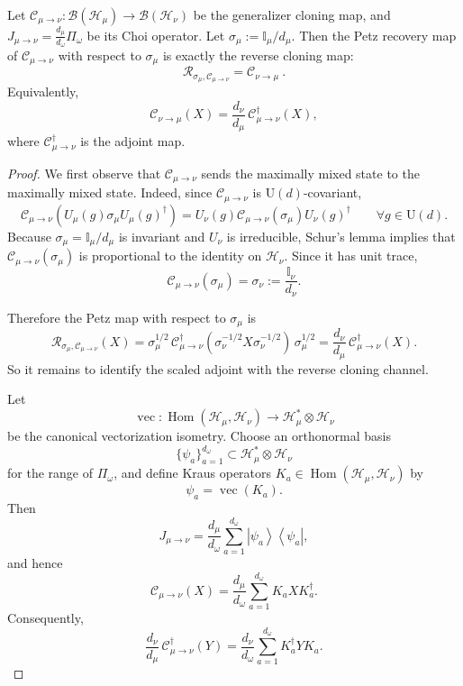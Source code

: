 \documentclass[a4paper,onecolumn,11pt]{quantumarticle}
\providecommand{\customgenericname}{}
\newenvironment{mprop}[1]{%
  \renewcommand\customgenericname{Proposition}%
  \renewcommand\theinnercustomgeneric{#1}%
  \innercustomgeneric
}{\endinnercustomgeneric}
\newcommand{\ketbra}[2]{\left|#1\right\rangle\!\!\left\langle #2\right|}
\def\id{\mathbb{I}}
\def\C{\mathcal{C}}
\begin{document}
\begin{mprop}{2}[Reverse Cloner]
Let $\C_{\mu\to\nu}:\mathcal B(\mathcal H_\mu)\to \mathcal B(\mathcal H_\nu)$
be the generalizer cloning map, and $J_{\mu\to\nu}=\frac{d_\mu}{d_\omega}\Pi_\omega$ be its Choi operator. Let $\sigma_\mu :=  \id_\mu/d_\mu$.
Then the Petz recovery map of \(\C_{\mu\to\nu}\) with respect to \(\sigma_\mu\) is exactly the reverse  cloning map:
\[
\mathcal R_{\sigma_\mu,\C_{\mu\to\nu}}=\C_{\nu\to\mu}\ .
\]
Equivalently,
\[
\C_{\nu\to\mu}(X)=\frac{d_\nu}{d_\mu}\,\C_{\mu\to\nu}^{\dagger}(X),
\]
where \(\C_{\mu\to\nu}^{\dagger}\) is the adjoint map.
\end{mprop}

\begin{proof}
We first observe that \(\C_{\mu\to\nu}\) sends the maximally mixed state to the maximally mixed state. Indeed, since \(\C_{\mu\to\nu}\) is \(\mathrm U(d)\)-covariant,
\[
\C_{\mu\to\nu}\!\left(U_\mu(g)\sigma_\mu U_\mu(g)^\dagger\right)
=
U_\nu(g)\C_{\mu\to\nu}(\sigma_\mu)U_\nu(g)^\dagger
\qquad \forall g\in \mathrm U(d).
\]
Because \(\sigma_\mu=\id_\mu/d_\mu\) is invariant and \(U_\nu\) is irreducible, Schur's lemma implies that \(\C_{\mu\to\nu}(\sigma_\mu)\) is proportional to the identity on \(\mathcal H_\nu\). Since it has unit trace,
\[
\C_{\mu\to\nu}(\sigma_\mu)=\sigma_\nu:= \frac{\id_\nu}{d_\nu}.
\]

Therefore the Petz map with respect to \(\sigma_\mu\) is
\[
\mathcal R_{\sigma_\mu,\C_{\mu\to\nu}}(X)
=
\sigma_\mu^{1/2}\,
\C_{\mu\to\nu}^{\dagger}
\!\left(
\sigma_\nu^{-1/2}X\sigma_\nu^{-1/2}
\right)
\,\sigma_\mu^{1/2}
=
\frac{d_\nu}{d_\mu}\,\C_{\mu\to\nu}^{\dagger}(X).
\]
So it remains to identify the scaled adjoint with the reverse cloning channel.

Let
\[
\operatorname{vec}:\operatorname{Hom}(\mathcal H_\mu,\mathcal H_\nu)\longrightarrow \mathcal H_\mu^*\otimes \mathcal H_\nu
\]
be the canonical vectorization isometry. Choose an orthonormal basis
\[
\{\psi_a\}_{a=1}^{d_\omega}
\subset \mathcal H_\mu^*\otimes \mathcal H_\nu
\]
for the range of \(\Pi_\omega\), and define Kraus operators \(K_a\in \operatorname{Hom}(\mathcal H_\mu,\mathcal H_\nu)\) by
\[
\psi_a=\operatorname{vec}(K_a).
\]
Then
\[
J_{\mu\to\nu}
=
\frac{d_\mu}{d_\omega}
\sum_{a=1}^{d_\omega}
\ketbra{\psi_a}{\psi_a},
\]
and hence
\[
\C_{\mu\to\nu}(X)
=
\frac{d_\mu}{d_\omega}
\sum_{a=1}^{d_\omega}
K_a X K_a^\dagger.
\]
Consequently,
\[
\frac{d_\nu}{d_\mu}\,\C_{\mu\to\nu}^{\dagger}(Y)
=
\frac{d_\nu}{d_\omega}
\sum_{a=1}^{d_\omega}
K_a^\dagger Y K_a.
\]


\end{proof}
\end{document}
